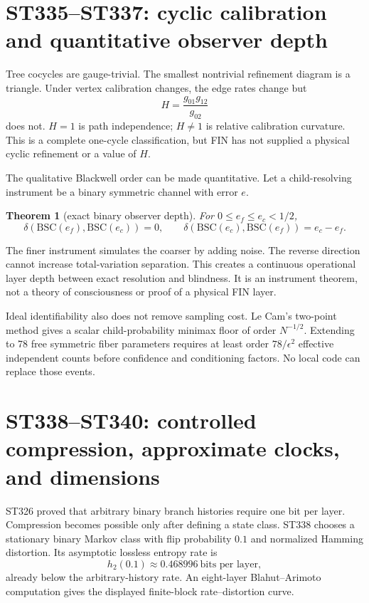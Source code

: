 \documentclass[11pt,a4paper]{article}
\newtheorem{theorem}{Theorem}[section]
\begin{document}
\section{ST335--ST337: cyclic calibration and quantitative observer depth}

Tree cocycles are gauge-trivial. The smallest nontrivial refinement diagram is a triangle.
Under vertex calibration changes, the edge rates change but
\[
H=\frac{g_{01}g_{12}}{g_{02}}
\]
does not. $H=1$ is path independence; $H\ne1$ is relative calibration curvature. This is a
complete one-cycle classification, but FIN has not supplied a physical cyclic refinement
or a value of $H$.

The qualitative Blackwell order can be made quantitative. Let a child-resolving instrument
be a binary symmetric channel with error $e$.
\begin{theorem}[exact binary observer depth]
For $0\le e_f\le e_c<1/2$,
\[
\delta(\mathrm{BSC}(e_f),\mathrm{BSC}(e_c))=0,
\qquad
\delta(\mathrm{BSC}(e_c),\mathrm{BSC}(e_f))=e_c-e_f.
\]
\end{theorem}
The finer instrument simulates the coarser by adding noise. The reverse direction cannot
increase total-variation separation. This creates a continuous operational layer depth
between exact resolution and blindness. It is an instrument theorem, not a theory of
consciousness or proof of a physical FIN layer.

Ideal identifiability also does not remove sampling cost. Le Cam's two-point method gives a
scalar child-probability minimax floor of order $N^{-1/2}$. Extending to 78 free symmetric
fiber parameters requires at least order $78/\epsilon^2$ effective independent counts before
confidence and conditioning factors. No local code can replace those events.

\section{ST338--ST340: controlled compression, approximate clocks, and dimensions}

ST326 proved that arbitrary binary branch histories require one bit per layer. Compression
becomes possible only after defining a state class. ST338 chooses a stationary binary
Markov class with flip probability $0.1$ and normalized Hamming distortion. Its asymptotic
lossless entropy rate is
\[
h_2(0.1)\approx0.468996\ \text{bits per layer},
\]
already below the arbitrary-history rate. An eight-layer Blahut--Arimoto computation gives
the displayed finite-block rate--distortion curve.
\end{document}

